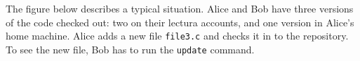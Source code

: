 The figure below describes a typical situation.
Alice and Bob have three versions of the code checked out:
two on their lectura accounts, and one version in Alice's
home machine. Alice adds a new file {\tt file3.c} and 
checks it in to the repository. To see the new file, 
Bob has to run the {\tt update} command.
\begin{center}
   
\end{center}

